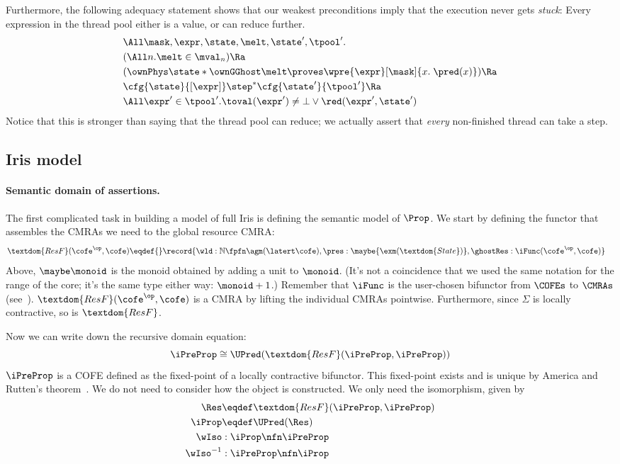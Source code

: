 Furthermore, the following adequacy statement shows that our weakest preconditions imply that the execution never gets \emph{stuck}: Every expression in the thread pool either is a value, or can reduce further.
\begin{align*}
 &\All \mask, \expr, \state, \melt, \state', \tpool'.
 \\&(\All n. \melt \in \mval_n) \Ra
 \\&( \ownPhys\state * \ownGGhost\melt \proves \wpre{\expr}[\mask]{x.\; \pred(x)}) \Ra
 \\&\cfg{\state}{[\expr]} \step^\ast
     \cfg{\state'}{\tpool'} \Ra
     \\&\All\expr'\in\tpool'. \toval(\expr') \neq \bot \lor \red(\expr', \state')
\end{align*}
Notice that this is stronger than saying that the thread pool can reduce; we actually assert that \emph{every} non-finished thread can take a step.

\subsection{Iris model}

\paragraph{Semantic domain of assertions.}
The first complicated task in building a model of full Iris is defining the semantic model of $\Prop$.
We start by defining the functor that assembles the CMRAs we need to the global resource CMRA:
\begin{align*}
  \textdom{ResF}(\cofe^\op, \cofe) \eqdef{}& \record{\wld: \mathbb{N} \fpfn \agm(\latert \cofe), \pres: \maybe{\exm(\textdom{State})}, \ghostRes: \iFunc(\cofe^\op, \cofe)}
\end{align*}
Above, $\maybe\monoid$ is the monoid obtained by adding a unit to $\monoid$.
(It's not a coincidence that we used the same notation for the range of the core; it's the same type either way: $\monoid + 1$.)
Remember that $\iFunc$ is the user-chosen bifunctor from $\COFEs$ to $\CMRAs$ (see~).
$\textdom{ResF}(\cofe^\op, \cofe)$ is a CMRA by lifting the individual CMRAs pointwise.
Furthermore, since $\Sigma$ is locally contractive, so is $\textdom{ResF}$.

Now we can write down the recursive domain equation:
\[ \iPreProp \cong \UPred(\textdom{ResF}(\iPreProp, \iPreProp)) \]
$\iPreProp$ is a COFE defined as the fixed-point of a locally contractive bifunctor.
This fixed-point exists and is unique by America and Rutten's theorem~\cite{America-Rutten:JCSS89,birkedal:metric-space}.
We do not need to consider how the object is constructed. 
We only need the isomorphism, given by
\begin{align*}
  \Res &\eqdef \textdom{ResF}(\iPreProp, \iPreProp) \\
  \iProp &\eqdef \UPred(\Res) \\
	\wIso &: \iProp \nfn \iPreProp \\
	\wIso^{-1} &: \iPreProp \nfn \iProp
\end{align*}

